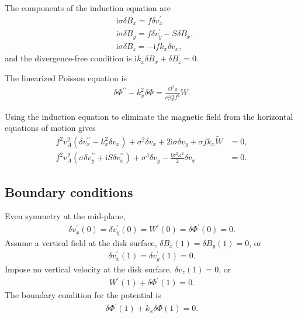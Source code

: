 \documentclass[12pt,preprint]{aastex}
\newcommand{\imgi}{\mathrm{i}}
\newcommand{\dd}{\delta}
\newcommand{\dvx}{\dd v_x}
\newcommand{\dvy}{\dd v_y}
\newcommand{\dvz}{\dd v_z}
\newcommand{\dbx}{\dd B_x}
\newcommand{\dby}{\dd B_y}
\newcommand{\dbz}{\dd B_z}
\newcommand{\w}{ \widetilde{W}}
\newcommand{\dphi}{\dd \Phi}
\begin{document}
The components of the induction equation are 
\begin{align}
&  \imgi\sigma\dbx = f \dvx^\prime\label{induct_x}\\
&\imgi \sigma \dby = f\dvy^\prime - S\dbx, \label{induct_y}\\
& \imgi\sigma \dbz = -\imgi  f k_x \dvx, \label{induct_vert}
\end{align}    
and the divergence-free condition is $\imgi k_x\dbx +
\dbz^\prime=0$. 

The linearized Poisson equation is 
\begin{align}
  \dphi^{\prime\prime} - k_x^2\dphi =
  \frac{\Omega^2\rho}{c_s^2Qf^2}W.  \label{lin_poisson} 
\end{align}

Using the induction equation to eliminate the magnetic field from the
horizontal equations of motion gives
\begin{align}
f^2v_A^2\left(\dvx^{\prime\prime} - k_x^2\dvx\right) + \sigma^2\dvx +
2\imgi\sigma\dvy + \sigma f k_x \w &= 0,\label{vx_new}\\
f^2v_A^2\left(\sigma\dvy^{\prime\prime} + \imgi S
\dvx^{\prime\prime}\right) + \sigma^3\dvy - \frac{\imgi\sigma^2\kappa^2}{2}\dvx&=0.\label{vy_new}
\end{align}


\subsection{Boundary conditions}
Even symmetry at the mid-plane,
\begin{align}
  \dvx^\prime(0) = \dvy^\prime(0)=W^\prime(0) = \dphi^\prime(0) = 0.
\end{align}
Assume a vertical field at the disk surface, $\delta B_x(1) = \delta
B_y(1) = 0$, or 
\begin{align}
  \dvx^\prime(1) = \dvy^\prime(1) = 0. 
\end{align}
Impose no vertical velocity at the disk surface, $\dvz(1) = 0$, or 
\begin{align}
  W^\prime(1) + \dphi^\prime(1) = 0. 
\end{align}
The boundary condition for the potential is
\begin{align}
  \dphi^\prime (1) + k_x \dphi(1) = 0.  \label{pot_cond}
\end{align}
\end{document}
